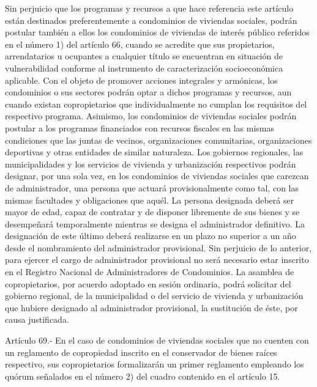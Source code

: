     Sin perjuicio que los programas y recursos a que hace referencia este artículo están destinados preferentemente a condominios de viviendas sociales, podrán postular también a ellos los condominios de viviendas de interés público referidos en el número 1) del artículo 66, cuando se acredite que sus propietarios, arrendatarios u ocupantes a cualquier título se encuentran en situación de vulnerabilidad conforme al instrumento de caracterización socioeconómica aplicable.
    Con el objeto de promover acciones integrales y armónicas, los condominios o sus sectores podrán optar a dichos programas y recursos, aun cuando existan copropietarios que individualmente no cumplan los requisitos del respectivo programa.
    Asimismo, los condominios de viviendas sociales podrán postular a los programas financiados con recursos fiscales en las mismas condiciones que las juntas de vecinos, organizaciones comunitarias, organizaciones deportivas y otras entidades de similar naturaleza.
    Los gobiernos regionales, las municipalidades y los servicios de vivienda y urbanización respectivos podrán designar, por una sola vez, en los condominios de viviendas sociales que carezcan de administrador, una persona que actuará provisionalmente como tal, con las mismas facultades y obligaciones que aquél.
    La persona designada deberá ser mayor de edad, capaz de contratar y de disponer libremente de sus bienes y se desempeñará temporalmente mientras se designa el administrador definitivo. La designación de este último deberá realizarse en un plazo no superior a un año desde el nombramiento del administrador provisional. Sin perjuicio de lo anterior, para ejercer el cargo de administrador provisional no será necesario estar inscrito en el Registro Nacional de Administradores de Condominios.
    La asamblea de copropietarios, por acuerdo adoptado en sesión ordinaria, podrá solicitar del gobierno regional, de la municipalidad o del servicio de vivienda y urbanización que hubiere designado al administrador provisional, la sustitución de éste, por causa justificada.
     
    Artículo 69.- En el caso de condominios de viviendas sociales que no cuenten con un reglamento de copropiedad inscrito en el conservador de bienes raíces respectivo, sus copropietarios formalizarán un primer reglamento empleando los quórum señalados en el número 2) del cuadro contenido en el artículo 15.
     
